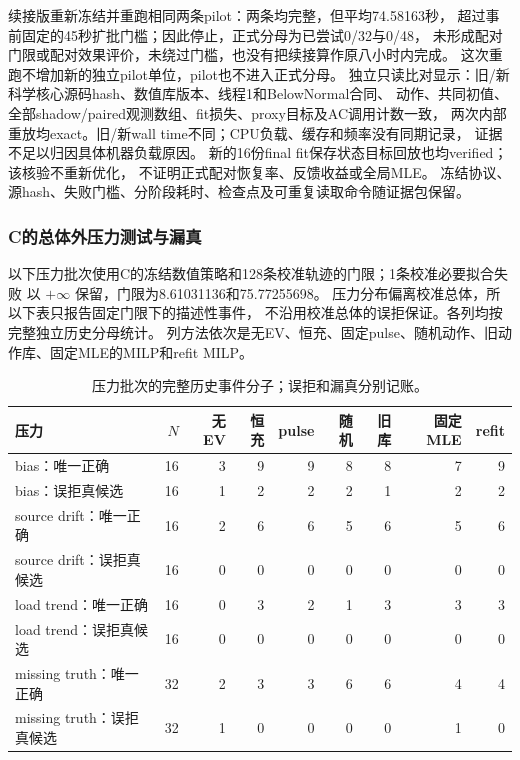 \documentclass[UTF8,fontset=fandol,11pt,a4paper]{ctexart}
\begin{document}
续接版重新冻结并重跑相同两条pilot：两条均完整，但平均74.58163秒，
超过事前固定的45秒扩批门槛；因此停止，正式分母为已尝试0/32与0/48，
未形成配对门限或配对效果评价，未绕过门槛，也没有把续接算作原八小时内完成。
这次重跑不增加新的独立pilot单位，pilot也不进入正式分母。
独立只读比对显示：旧/新科学核心源码hash、数值库版本、线程1和BelowNormal合同、
动作、共同初值、全部shadow/paired观测数组、fit损失、proxy目标及AC调用计数一致，
两次内部重放均exact。旧/新wall time不同；CPU负载、缓存和频率没有同期记录，
证据不足以归因具体机器负载原因。
新的16份final fit保存状态目标回放也均verified；该核验不重新优化，
不证明正式配对恢复率、反馈收益或全局MLE。
冻结协议、源hash、失败门槛、分阶段耗时、检查点及可重复读取命令随证据包保留。
\subsubsection{C的总体外压力测试与漏真}
\label{sec:stress-audited}
以下压力批次使用C的冻结数值策略和128条校准轨迹的门限；1条校准必要拟合失败
以 $+\infty$ 保留，门限为8.61031136和75.77255698。
压力分布偏离校准总体，所以下表只报告固定门限下的描述性事件，
不沿用校准总体的误拒保证。各列均按完整独立历史分母统计。
列方法依次是无EV、恒充、固定pulse、随机动作、旧动作库、固定MLE的MILP和refit MILP。

\begin{table}[htbp]
\centering\small
\begin{tabular}{lrrrrrrrr}
\hline
压力 & $N$ & 无EV & 恒充 & pulse & 随机 & 旧库 & 固定MLE & refit\\
\hline
bias：唯一正确 &16&3&9&9&8&8&7&9\\
bias：误拒真候选&16&1&2&2&2&1&2&2\\
source drift：唯一正确&16&2&6&6&5&6&5&6\\
source drift：误拒真候选&16&0&0&0&0&0&0&0\\
load trend：唯一正确&16&0&3&2&1&3&3&3\\
load trend：误拒真候选&16&0&0&0&0&0&0&0\\
missing truth：唯一正确&32&2&3&3&6&6&4&4\\
missing truth：误拒真候选&32&1&0&0&0&0&1&0\\
\hline
\end{tabular}
\caption{压力批次的完整历史事件分子；误拒和漏真分别记账。}
\end{table}
\end{document}

